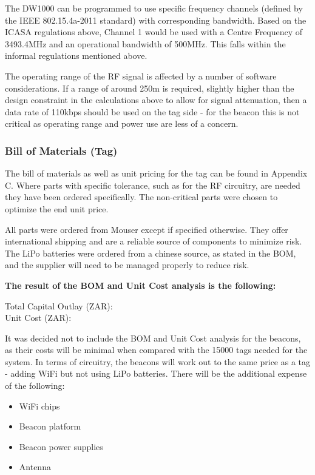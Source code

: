 The DW1000 can be programmed to use specific frequency channels (defined by the IEEE 802.15.4a-2011 standard) with corresponding bandwidth. Based on the ICASA regulations above, Channel 1 would be used with a Centre Frequency of 3493.4MHz and an operational bandwidth of 500MHz. This falls within the informal regulations mentioned above. 

The operating range of the RF signal is affected by a number of software considerations. If a range of around 250m is required, slightly higher than the design constraint in the calculations above to allow for signal attenuation, then a data rate of 110kbps should be used on the tag side - for the beacon this is not critical as operating range and power use are less of a concern.

\newpage
\subsubsection{Bill of Materials (Tag)}
The bill of materials as well as unit pricing for the tag can be found in Appendix C. Where parts with specific tolerance, such as for the RF circuitry, are needed they have been ordered specifically. The non-critical parts were chosen to optimize the end unit price. 

All parts were ordered from Mouser except if specified otherwise. They offer international shipping and are a reliable source of components to minimize risk. The LiPo batteries were ordered from a chinese source, as stated in the BOM, and the supplier will need to be managed properly to reduce risk.

\textbf{The result of the BOM and Unit Cost analysis is the following:}

Total Capital Outlay (ZAR): \\
Unit Cost (ZAR):

It was decided not to include the BOM and Unit Cost analysis for the beacons, as their costs will be minimal when compared with the 15000 tags needed for the system. In terms of circuitry, the beacons will work out to the same price as a tag - adding WiFi but not using LiPo batteries. There will be the additional expense of the following:

\begin{itemize}
\item WiFi chips
\item Beacon platform
\item Beacon power supplies
\item Antenna 
\end{itemize}

